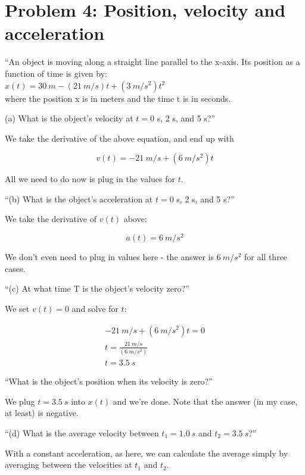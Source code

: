 \documentclass[8.01x]{subfiles}
\begin{document}
\section{Problem 4: Position, velocity and acceleration}

``An object is moving along a straight line parallel to the x-axis. Its position as a function of time is given by:\\
$x(t) = \SI{30}{m} - (\SI{21}{m/s}) t + (\SI{3}{m/s^2}) t^2$\\
where the position x is in meters and the time t is in seconds.

(a) What is the object's velocity at $t = 0$ s, 2 s, and 5 s?''

We take the derivative of the above equation, and end up with

\begin{equation}
v(t) = - \SI{21}{m/s} + (\SI{6}{m/s^2}) t
\end{equation}

All we need to do now is plug in the values for $t$.

``(b) What is the object's acceleration at $t = 0$ s, 2 s, and 5 s?''

We take the derivative of $v(t)$ above:

\begin{equation}
a(t) = \SI{6}{m/s^2}
\end{equation}

We don't even need to plug in values here - the answer is $\SI{6}{m/s^2}$ for all three cases.

``(c) At what time T is the object's velocity zero?''

We set $v(t) = 0$ and solve for $t$:

\begin{align}
- \SI{21}{m/s} + (\SI{6}{m/s^2}) t = 0\\
t = \frac{\SI{21}{m/s}}{(\SI{6}{m/s^2})}\\
t = \SI{3.5}{s}
\end{align}

``What is the object's position when its velocity is zero?''

We plug $t = \SI{3.5}{s}$ into $x(t)$ and we're done. Note that the answer (in my case, at least) is negative.

``(d) What is the average velocity between $t_1 = \SI{1.0}{s}$ and $t_2 = \SI{3.5}{s}$?''

With a constant acceleration, as here, we can calculate the average simply by averaging between the velocities at $t_1$ and $t_2$.
\end{document}
